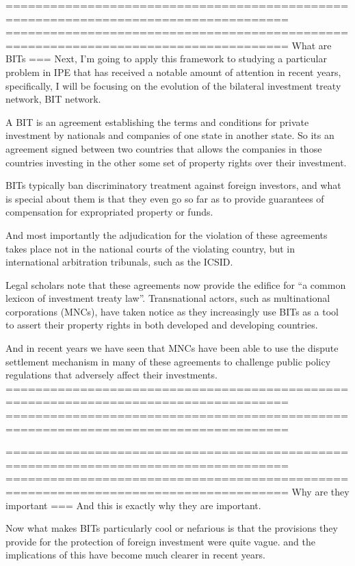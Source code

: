====================================================================================
====================================================================================
What are BITs
===
Next, I'm going to apply this framework to studying a particular problem in IPE that has received a notable amount of attention in recent years, specifically, I will be focusing on the evolution of the bilateral investment treaty network, BIT network. 

A BIT is an agreement establishing the terms and conditions for private investment by nationals and companies of one state in another state. So its an agreement signed between two countries that allows the companies in those countries investing in the other some set of property rights over their investment.

BITs typically ban discriminatory treatment against foreign investors, and what is special about them is that they even go so far as to provide guarantees of compensation for expropriated property or funds. 

And most importantly the adjudication for the violation of these agreements takes place not in the national courts of the violating country, but in international arbitration tribunals, such as the ICSID.

Legal scholars note that these agreements now provide the edifice for “a common lexicon of investment treaty law”. Transnational actors, such as multinational corporations (MNCs), have taken notice as they increasingly use BITs as a tool to assert their property rights in both developed and developing countries. 

And in recent years we have seen that MNCs have been able to use the dispute settlement mechanism in many of these agreements to challenge public policy regulations that adversely affect their investments. 
====================================================================================
====================================================================================

====================================================================================
====================================================================================
Why are they important
===
And this is exactly why they are important.

Now what makes BITs particularly cool or nefarious is that the provisions they provide for the protection of foreign investment were quite vague. and the implications of this have become much clearer in recent years. 

